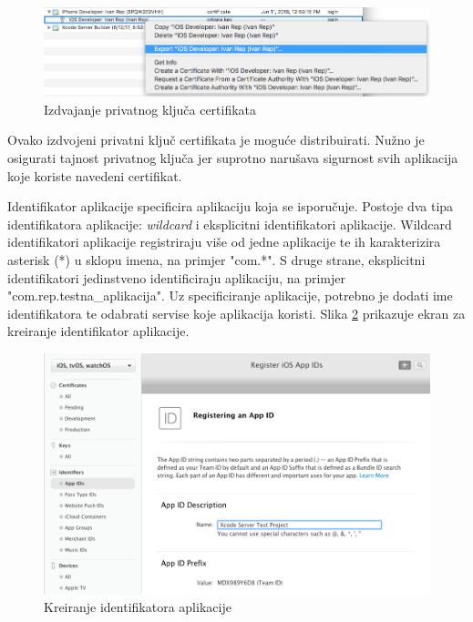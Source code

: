\documentclass[times, utf8, diplomski, numeric]{fer}
\begin{document}
\begin{appendices}
\begin{figure}[b!]
\centering
\includegraphics[scale=0.4]{PrivateKeyExport}
\caption{Izdvajanje privatnog ključa certifikata}
\label{fig:PrivateKeyExport}
\end{figure}

Ovako izdvojeni privatni ključ certifikata je moguće distribuirati. Nužno je osigurati tajnost privatnog ključa jer suprotno narušava sigurnost svih aplikacija koje koriste navedeni certifikat.

Identifikator aplikacije specificira aplikaciju koja se isporučuje. Postoje dva tipa identifikatora aplikacije: \textit{wildcard} i eksplicitni identifikatori aplikacije. Wildcard identifikatori aplikacije registriraju više od jedne aplikacije te ih karakterizira asterisk (*) u sklopu imena, na primjer "com.*". S druge strane, eksplicitni identifikatori jedinstveno identificiraju aplikaciju, na primjer "com.rep.testna\_aplikacija". Uz specificiranje aplikacije, potrebno je dodati ime identifikatora te odabrati servise koje aplikacija koristi. Slika \ref{fig:AppIdentifierCreation} prikazuje ekran za kreiranje identifikator aplikacije.

\begin{figure}
\centering
\includegraphics[scale=0.4]{AppIdentifierCreation}
\caption{Kreiranje identifikatora aplikacije}
\label{fig:AppIdentifierCreation}
\end{figure}


\end{appendices}
\end{document}
